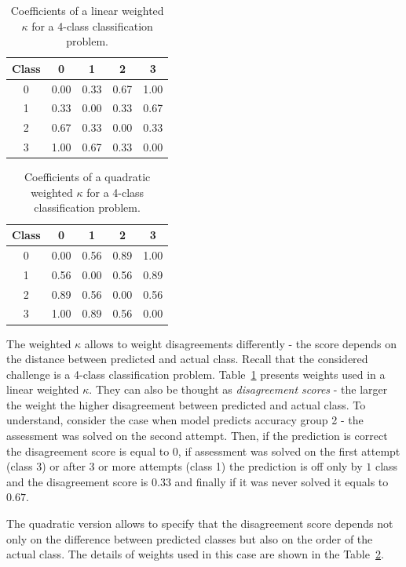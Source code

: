 \documentclass[fleqn,10pt]{SelfArx} %
\begin{document}
\begin{table}[!h]
    \caption{Coefficients of a linear weighted $\kappa$ for a 4-class classification problem.}
    \centering
    \begin{tabular}{c|cccc}
        Class & 0 & 1 & 2 & 3 \\
        \hline
        0 & 0.00 & 0.33 & 0.67 & 1.00 \\
        1 & 0.33 & 0.00 & 0.33 & 0.67 \\
        2 & 0.67 & 0.33 & 0.00 & 0.33 \\
        3 & 1.00 & 0.67 & 0.33 & 0.00 \\
    \end{tabular}
    \label{tab:linear-kappa}
\end{table}

\begin{table}[!h]
    \caption{Coefficients of a quadratic weighted $\kappa$ for a 4-class classification problem.}
    \centering
    \begin{tabular}{c|cccc}
        Class & 0 & 1 & 2 & 3 \\
        \hline
        0 & 0.00 & 0.56 & 0.89 & 1.00 \\
        1 & 0.56 & 0.00 & 0.56 & 0.89 \\
        2 & 0.89 & 0.56 & 0.00 & 0.56 \\
        3 & 1.00 & 0.89 & 0.56 & 0.00 \\
    \end{tabular}
    \label{tab:quadratic-kappa}
\end{table}

The weighted $\kappa$ allows to weight disagreements differently - the score depends on the distance between predicted and actual class.
Recall that the considered challenge is a 4-class classification problem.
Table~\ref{tab:linear-kappa} presents weights used in a linear weighted $\kappa$.
They can also be thought as \textit{disagreement scores} - the larger the weight the higher disagreement between predicted and actual class.
To understand, consider the case when model predicts accuracy group 2 - the assessment was solved on the second attempt.
Then, if the prediction is correct the disagreement score is equal to $0$, if assessment was solved on the first attempt (class 3) or after 3 or more attempts (class 1) the prediction is off only by $1$ class and the disagreement score is $0.33$ and finally if it was never solved it equals to $0.67$.

The quadratic version allows to specify that the disagreement score depends not only on the difference between predicted classes but also on the order of the actual class.
The details of weights used in this case are shown in the Table~\ref{tab:quadratic-kappa}.
\end{document}
